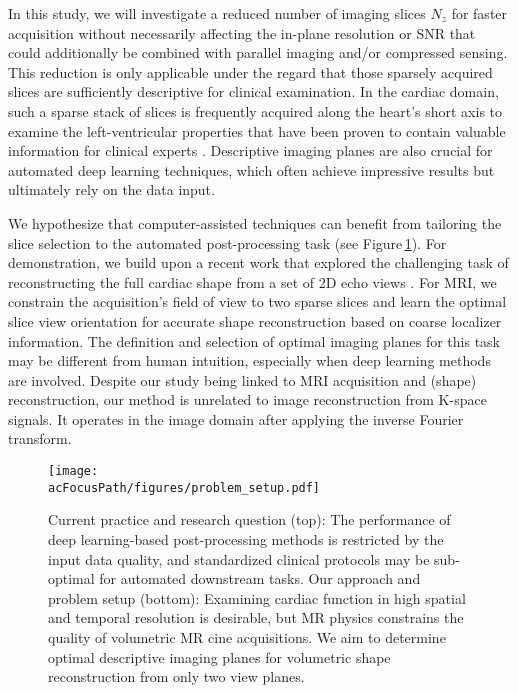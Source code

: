     In this study, we will investigate a reduced number of imaging slices $N_z$ for faster acquisition without necessarily affecting the in-plane resolution or SNR that could additionally be combined with parallel imaging and/or compressed sensing.
    This reduction is only applicable under the regard that those sparsely acquired slices are sufficiently descriptive for clinical examination.
    In the cardiac domain, such a sparse stack of slices is frequently acquired along the heart's short axis to examine the left-ventricular properties that have been proven to contain valuable information for clinical experts \cite{american2002standardized}. Descriptive imaging planes are also crucial for automated deep learning techniques, which often achieve impressive results but ultimately rely on the data input.

    We hypothesize that computer-assisted techniques can benefit from tailoring the slice selection to the automated post-processing task (see Figure\,\ref{fig:problem_setup}).
    For demonstration, we build upon a recent work that explored the challenging task of reconstructing the full cardiac shape from a set of 2D echo views \cite{stojanovski2022efficient}. For MRI, we constrain the acquisition's field of view to two sparse slices and learn the optimal slice view orientation for accurate shape reconstruction based on coarse localizer information.
    The definition and selection of optimal imaging planes \cite{watkins2013cardiovascular,american2002standardized,ismail2022cardiac} for this task may be different from human intuition, especially when deep learning methods are involved. Despite our study being linked to MRI acquisition and (shape) reconstruction, our method is unrelated to image reconstruction from K-space signals. It operates in the image domain after applying the inverse Fourier transform.


    \begin{figure}
        \texttt{[image: \\acFocusPath/figures/problem\_setup.pdf]}
        \caption{Current practice and research question (top): The performance of deep learning-based post-processing methods is restricted by the input data quality, and standardized clinical protocols may be sub-optimal for automated downstream tasks. Our approach and problem setup (bottom): Examining cardiac function in high spatial and temporal resolution is desirable, but MR physics constrains the quality of volumetric MR cine acquisitions. We aim to determine optimal descriptive imaging planes for volumetric shape reconstruction from only two view planes.}
    \label{fig:problem_setup}
    \end{figure}

